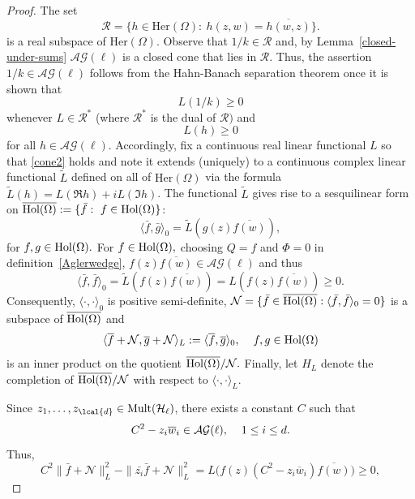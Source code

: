 \documentclass[a4paper,reqno,index]{amsart}
\numberwithin{equation}{section}
\theoremstyle{definition}
\begin{document}
\begin{proof}
The set 
\[\mathcal{R}=\{h\in\text{Her}(\Omega):\ h(z, w)=\overline{h(w, z)}\}.\]
 is a real subspace of $\text{Her}(\Omega)$. Observe that $1/k\in \mathcal{R}$ and, by Lemma~\ref{closed-under-sums}
 $\mathcal{AG}(\ell)$ is a closed cone that lies in $\mathcal{R}$. 
Thus, the assertion $1/k\in \mathcal{AG}(\ell)$ follows from the Hahn-Banach separation theorem once
it is shown that 
\begin{equation}\label{cone1}
L(1/k)\ge 0    
\end{equation}
whenever $L\in \mathcal{R}^*$ (where $\mathcal{R}^*$ is the dual of $\mathcal{R})$ and 
\begin{equation}\label{cone2}
 L(h)\ge 0
\end{equation}
for all  $h\in \mathcal{AG}(\ell).$
Accordingly, fix a continuous real linear functional $L$ so that \eqref{cone2} holds and note it extends
 (uniquely) to a continuous complex linear functional $\widetilde{L}$ defined on all of $\text{Her}(\Omega)$ via the formula $\widetilde{L}(h)=L(\Re{h})+iL(\Im{h})$. The functional $\widetilde{L}$  gives rise to a sesquilinear form on $\overline{\textup{Hol}(\Omega)}:=\{\bar{f}:\ f\in\textup{Hol}(\Omega)\}$:
\[
  \langle \bar{f}, \bar{g}\rangle_0=\widetilde{L}(g(z)\overline{f(w)}), 
\]
 for $f, g\in \textup{Hol}(\Omega).$
 For 
 $f\in \textup{Hol}(\Omega),$  choosing $Q=f$ and $\Phi=0$ in definition~\ref{Aglerwedge},  $f(z)\overline{f(w)}\in \mathcal{AG}(\ell)$   and thus
\[\langle \bar{f}, \bar{f}\rangle_0=\widetilde{L}(f(z)\overline{f(w)})=L(f(z)\overline{f(w)})\ge 0.\]
Consequently, $\langle \cdot, \cdot\rangle_0$ is positive semi-definite,   $\mathcal{N}=\{\bar{f}\in\overline{\textup{Hol}(\Omega)}: \langle \bar{f}, \bar{f}\rangle_0=0\}$ is a subspace of $\overline{\textup{Hol}(\Omega)} $ and 
\[\langle \overline{f}+\mathcal{N}, \overline{g}+\mathcal{N}\rangle_L:=\langle \overline{f}, \overline{g}\rangle_0, \hspace{0.4 cm} f, g\in\textup{Hol}(\Omega)\]
is an inner product on the quotient $\overline{\textup{Hol}(\Omega)}/\mathcal{N}.$
Finally, let $H_L$ denote the completion of $\overline{\textup{Hol}(\Omega)}/\mathcal{N}$ with respect to $\langle \cdot, \cdot\rangle_L$. \par 
Since $z_1, \dots, z_{\lcal{d}}\in\text{Mult}(\mathcal{H}_{\ell})$, there exists a constant $C$ such that
\[C^2-z_i\overline{w}_i\in \mathcal{AG}(\ell), \hspace{0.4 cm} 1\le i\le d.\]
Thus,
\[C^2\|\bar{f}+\mathcal{N}\|^2_L-\|\bar{z_i}\bar{f}+\mathcal{N}\|^2_L=L\big(f(z)(C^2-z_i\overline{w}_i)\overline{f(w)}\big)\ge 0, 
\]
\end{proof}
\end{document}
